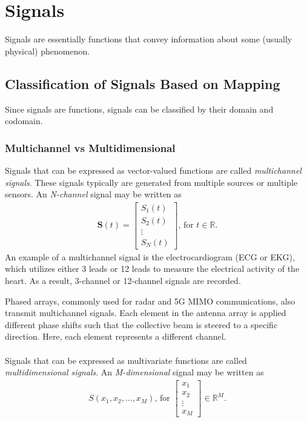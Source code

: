 \documentclass{report}
\begin{document}
\chapter{Signals}
Signals are essentially functions that convey information about some (usually physical) phenomenon. 

\section{Classification of Signals Based on Mapping}
Since signals are functions, signals can be classified by their domain and codomain. 

\subsection{Multichannel vs Multidimensional}
Signals that can be expressed as vector-valued functions are called \emph{multichannel signals}. These signals typically are generated 
from multiple sources or multiple sensors. An \emph{N-channel} signal may be written as 
\begin{align}
    \mathbf{S}(t) = 
    \begin{bmatrix}
        S_1(t) \\
        S_2(t) \\
        \vdots \\
        S_N(t)
    \end{bmatrix} \text{, for } t \in \mathbb{R}.
\end{align}
An example of a multichannel signal is the electrocardiogram (ECG or EKG), which utilizes either 3 leads or 12 leads to measure 
the electrical activity of the heart. As a result, 3-channel or 12-channel signals are recorded.

Phased arrays, commonly used for radar and 5G MIMO communications, also transmit multichannel signals. Each element in the antenna array is applied different  
phase shifts such that the collective beam is steered to a specific direction. Here, each element represents a different channel.
\\ \\
Signals that can be expressed as multivariate functions are called \emph{multidimensional signals}. An \emph{M-dimensional} signal may 
be written as
\begin{align}
    S(x_1,x_2,...,x_M) \text{, for } 
    \begin{bmatrix}
        x_1 \\
        x_2 \\
        \vdots \\
        x_M
    \end{bmatrix} \in \mathbb{R}^M.
\end{align}
\end{document}
